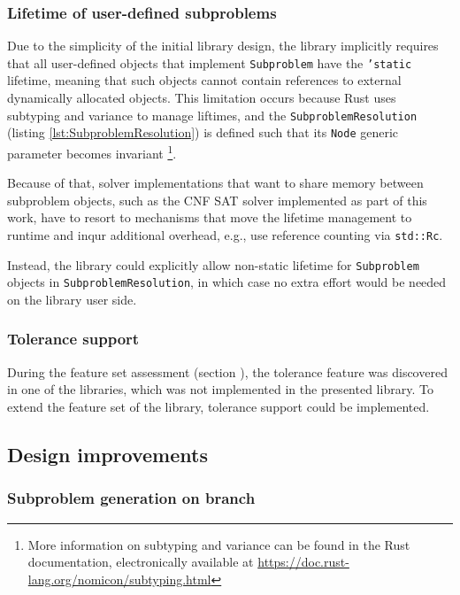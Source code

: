 \subsubsection{Lifetime of user-defined subproblems}

Due to the simplicity of the initial library design, the library implicitly requires
that all user-defined objects that implement \texttt{Subproblem} have the \texttt{'static}
lifetime, meaning that such objects cannot contain references to external
dynamically allocated objects. This limitation occurs because Rust uses subtyping and
variance to manage liftimes, and the \texttt{SubproblemResolution}
(listing \ref{lst:SubproblemResolution}) is defined
such that its \texttt{Node} generic parameter becomes invariant
\footnote{More information on subtyping and variance can be found in the Rust documentation,
electronically available at \url{https://doc.rust-lang.org/nomicon/subtyping.html}}.

Because of that, solver implementations that want to share memory between subproblem objects,
such as the CNF SAT solver implemented as part of this work, have to resort to mechanisms
that move the lifetime management to runtime and inqur additional overhead, e.g.,
use reference counting via \texttt{std::Rc}.

Instead, the library could explicitly allow non-static lifetime for \texttt{Subproblem}
objects in \texttt{SubproblemResolution}, in which case no extra effort would be needed
on the library user side.

\subsubsection{Tolerance support}

During the feature set assessment (section \label{sec:feature_cmp}), the tolerance
feature was discovered in one of the libraries, which was not implemented in the
presented library. To extend the feature set of the library, tolerance support
could be implemented.

\subsection{Design improvements}

\label{sub:design_improvements}

\subsubsection{Subproblem generation on branch}

